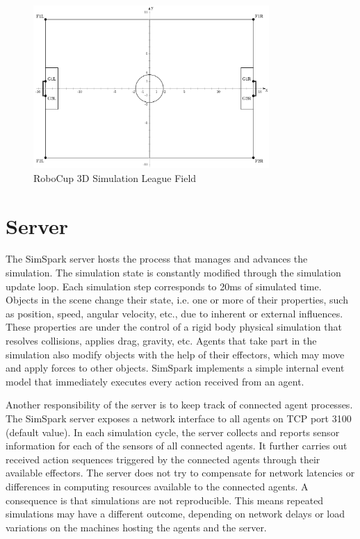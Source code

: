 \begin{figure}[ht!]
\centering
  \includegraphics[width=0.8\textwidth]{Chapter2/figures/SoccerSimulation_FieldPlan.png}
  \caption{RoboCup 3D Simulation League Field} 
  \label{fig:SimulationSoccerField}
\end{figure}

\section{Server}
The SimSpark server hosts the process that manages and advances the simulation. The simulation state is constantly modified through the simulation update loop. Each simulation step corresponds to 20ms of simulated time. Objects in the scene change their state, i.e. one or more of their properties, such as position, speed, angular velocity, etc., due to inherent or external influences. These properties are under the control of a rigid body physical simulation that resolves collisions, applies drag, gravity, etc. Agents that take part in the simulation also modify objects with the help of their effectors, which may move and apply forces to other objects. SimSpark implements a simple internal event model that immediately executes every action received from an agent.


Another responsibility of the server is to keep track of connected agent processes. The SimSpark server exposes a network interface to all agents on TCP port 3100 (default value). In each simulation cycle, the server collects and reports sensor information for each of the sensors of all connected agents. It further carries out received action sequences triggered by the connected agents through their available effectors.
The server does not try to compensate for network latencies or differences in computing resources available to the connected agents. A consequence is that simulations are not reproducible. This means repeated simulations may have a different outcome, depending on network delays or load variations on the machines hosting the agents and the server.


